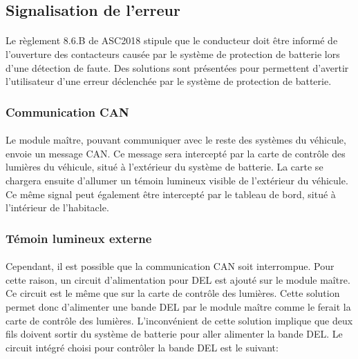 
\subsection{Signalisation de l'erreur}

	\paragraph*{}
	Le règlement 8.6.B de ASC2018\cite{ASC2018} stipule que le conducteur doit être informé de l'ouverture des contacteurs causée par le système de protection de batterie lors d'une détection de faute. Des solutions sont présentées pour permettent d'avertir l'utilisateur d'une erreur déclenchée par le système de protection de batterie. 
	
	\subsubsection{Communication CAN}
		\paragraph*{}
		Le module maître, pouvant communiquer avec le reste des systèmes du véhicule, envoie un message CAN. Ce message sera intercepté par la carte de contrôle des lumières du véhicule, situé à l'extérieur du système de batterie. La carte se chargera ensuite d'allumer un témoin lumineux visible de l'extérieur du véhicule. Ce même signal peut également être intercepté par le tableau de bord, situé à l'intérieur de l'habitacle.
		
	\subsubsection{Témoin lumineux externe}
		\paragraph*{}
		Cependant, il est possible que la communication CAN soit interrompue. Pour cette raison, un circuit d'alimentation pour DEL est ajouté sur le module maître. Ce circuit est le même que sur la carte de contrôle des lumières. Cette solution permet donc d'alimenter une bande DEL par le module maître comme le ferait la carte de contrôle des lumières. L'inconvénient de cette solution implique que deux fils doivent sortir du système de batterie pour aller alimenter la bande DEL. Le circuit intégré choisi pour contrôler la bande DEL est le suivant:
	
